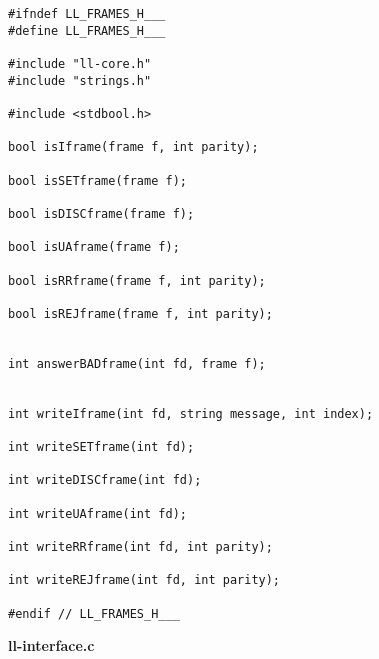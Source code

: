 \documentclass[subfiles]{main.tex}
\begin{document}
\begin{lstlisting}[style=rcom]
#ifndef LL_FRAMES_H___
#define LL_FRAMES_H___

#include "ll-core.h"
#include "strings.h"

#include <stdbool.h>

bool isIframe(frame f, int parity);

bool isSETframe(frame f);

bool isDISCframe(frame f);

bool isUAframe(frame f);

bool isRRframe(frame f, int parity);

bool isREJframe(frame f, int parity);


int answerBADframe(int fd, frame f);


int writeIframe(int fd, string message, int index);

int writeSETframe(int fd);

int writeDISCframe(int fd);

int writeUAframe(int fd);

int writeRRframe(int fd, int parity);

int writeREJframe(int fd, int parity);

#endif // LL_FRAMES_H___
\end{lstlisting}

{\Large\textbf{ll-interface.c}}
\end{document}
